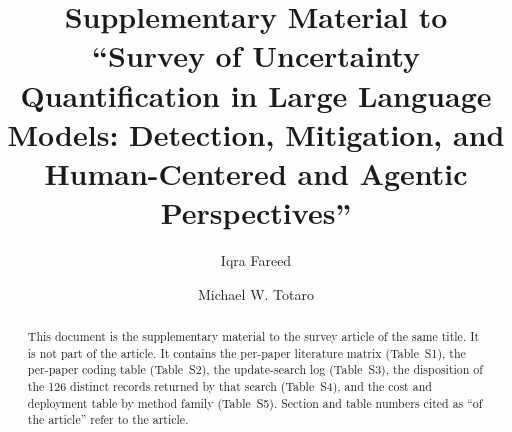 \documentclass[acmsmall]{acmart}
\begin{document}

\title{Supplementary Material to ``Survey of Uncertainty Quantification in Large Language Models: Detection, Mitigation, and Human-Centered and Agentic Perspectives''}

\author{Iqra Fareed}

\author{Michael W. Totaro}

\renewcommand{\shortauthors}{}


\begin{abstract}
This document is the supplementary material to the survey article of the same title. It is not part of the article. It contains the per-paper literature matrix (Table~S1), the per-paper coding table (Table~S2), the update-search log (Table~S3), the disposition of the 126 distinct records returned by that search (Table~S4), and the cost and deployment table by method family (Table~S5). Section and table numbers cited as ``of the article'' refer to the article.
\end{abstract}


\maketitle

\setcounter{table}{0}
\renewcommand{\thetable}{S\arabic{table}}
\end{document}
